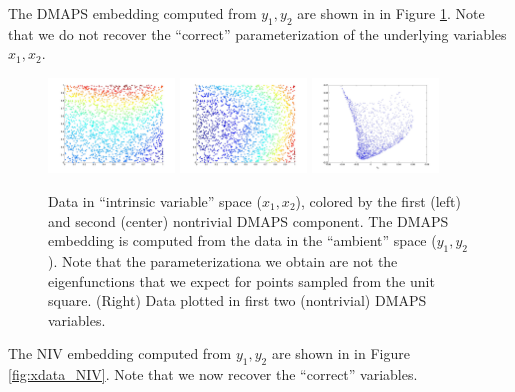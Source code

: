 \documentclass[12pt]{article}
\begin{document}
The DMAPS embedding computed from $y_1, y_2$ are shown in in Figure \ref{fig:xdata_dmaps}.
%
Note that we do not recover the ``correct'' parameterization of the underlying variables $x_1, x_2$.

\begin{figure}[H]
\includegraphics[width=0.3\textwidth]{xdata_colored_DMAPS1}
\includegraphics[width=0.3\textwidth]{xdata_colored_DMAPS2}
\includegraphics[width=0.3\textwidth]{embedding_dmaps}
\caption{Data in ``intrinsic variable'' space ($x_1, x_2$), colored by the first (left) and second (center) nontrivial DMAPS component. The DMAPS embedding is computed from the data in the ``ambient'' space ($y_1, y_2$). Note that the parameterizationa we obtain are not the eigenfunctions that we expect for points sampled from the unit square. (Right) Data plotted in first two (nontrivial) DMAPS variables.}
\label{fig:xdata_dmaps}
\end{figure}

The NIV embedding computed from $y_1, y_2$ are shown in in Figure  \ref{fig:xdata_NIV}.
%
Note that we now recover the ``correct'' variables.
\end{document}
